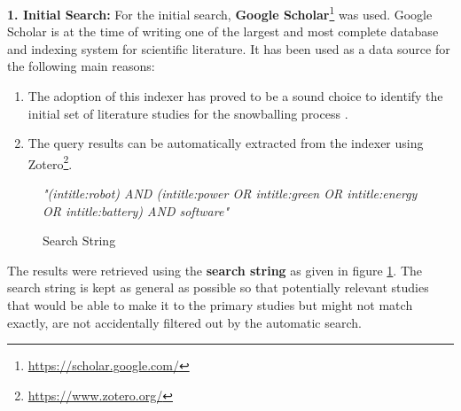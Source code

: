 \noindent\textbf{1. Initial Search:}
For the initial search, \textbf{Google Scholar}\footnote{\url{https://scholar.google.com/}} was used. 
Google Scholar is at the time of writing one of the largest and most complete database and indexing system for scientific literature.
It has been used as a data source for the following main reasons:
\begin{enumerate}
    \item The adoption of this indexer has proved to be a sound choice to identify the initial set 
    of literature studies for the snowballing process \cite{wohlin2014snowballing}.
    \item The query results can be automatically extracted from the indexer using Zotero\footnote{\url{https://www.zotero.org/}}.
\end{enumerate}

\begin{figure}
    \centering
    \textit{"(intitle:robot) AND (intitle:power OR intitle:green OR intitle:energy OR intitle:battery) AND software"}
    \caption{Search String}
    \label{fig:search_string}
\end{figure}

The results were retrieved using the \textbf{search string} as given in figure \ref{fig:search_string}. 
The search string is kept as general as possible so that potentially relevant studies that would be able to make it 
to the primary studies but might not match exactly, are not accidentally filtered out by the automatic search.


